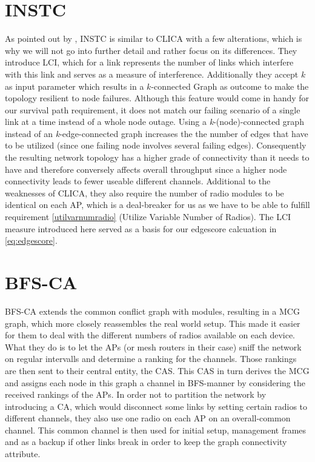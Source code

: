   \section{\ac{INSTC}}
    As pointed out by \cite{overview_caa}, INSTC \cite{INSTC} is similar to \ac{CLICA} with a few alterations, 
    which is why we will not go into further detail and rather focus on its differences. 
    They introduce \ac{LCI}, which for a link represents the number of links which interfere with this link \cite{overview_caa} and serves as a measure of 
    interference. Additionally they accept \(k\) as input parameter which results in a \(k\)-connected Graph as outcome to make the topology resilient to node failures.
    Although this feature would come in handy for our survival path requirement, it does not match our failing scenario of a single link at a time instead of a whole node outage.
    Using a \textit{k}-(node)-connected graph instead of an \textit{k}-edge-connected graph increases the the number of edges that have to be utilized 
    (since one failing node involves several failing edges). Consequently the resulting network topology has a higher grade of connectivity than it needs to 
    have and therefore conversely affects overall throughput since a higher node connectivity leads to fewer useable different channels. 
    Additional to the weaknesses of \ac{CLICA}, they also require the number of radio modules to be identical on each AP, 
    which is a deal-breaker for us as we have to be able to fulfill requirement \ref{utilvarnumradio} (Utilize Variable Number of Radios).
    The LCI measure introduced here served as a basis for our edgescore calcuation in \ref{eq:edgescore}.
    
  \section{\ac{BFS-CA}}
    \ac{BFS-CA} \cite{BFS-CA} extends the common conflict graph with modules, resulting in a \ac{MCG} graph, which more closely reassembles the
    real world setup. This made it easier for them to deal with the different numbers of radios available on each device. 
    What they do is to let the APs (or mesh routers in their case) sniff the network on regular intervalls and determine a ranking for the channels.
    Those rankings are then sent to their central entity, the \ac{CAS}. This \ac{CAS} in turn derives the \ac{MCG} and assigns each node in this graph 
    a channel in \ac{BFS}-manner by considering the received rankings of the APs. In order not to partition the network by introducing a \ac{CA}, which 
    would disconnect some links by setting certain radios to different channels, they also use one radio on each AP on an overall-common channel.
    This common channel is then used for initial setup, management frames and as a backup if other links break in order to keep the graph connectivity attribute.
    
